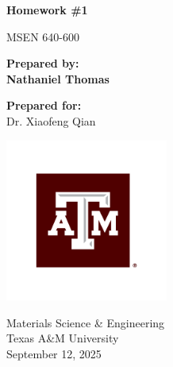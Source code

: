 \thispagestyle{empty}

\begin{titlepage}
  \begin{center}
    \vspace*{2cm}

    \Huge
    \textbf{Homework \#1}

    \vspace{0.8cm}

    \LARGE
    MSEN 640-600

    \vspace{2cm}

    \Large
    \textbf{Prepared by:}\\[0.5cm]
    \huge
    \textbf{Nathaniel Thomas}

    \vspace{1cm}

    \Large
    \textbf{Prepared for:}\\[0.5cm]
    \large
    Dr. Xiaofeng Qian

    \vfill

    \includegraphics[width=0.4\textwidth]{"./assets/a&m_logo.pdf"}

    \vspace{1cm}

    \Large
    Materials Science \& Engineering\\
    Texas A\&M University\\
    \vspace{0.5cm}
    \large
    September 12, 2025

  \end{center}
\end{titlepage}
